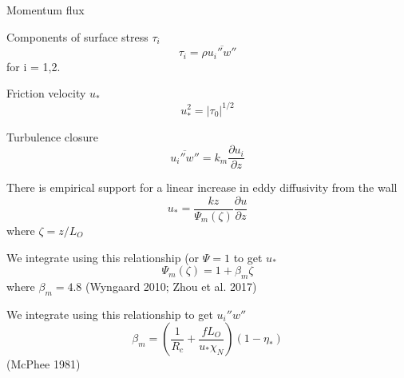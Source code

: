 Momentum flux

Components of surface stress $\tau_i$
\begin{equation*}
\tau_i = \rho \overline{u_i''w''}
\end{equation*}
for i = 1,2.

Friction velocity $u_*$
\begin{equation*}
u_*^2=|\tau_0|^{1/2}
\end{equation*}

Turbulence closure
\begin{equation*}
\overline{u_i''w''} = k_m \frac{\partial u_i}{\partial z}
\end{equation*}

There is empirical support for a linear increase in eddy diffusivity from the wall
\begin{equation*}
u_* = \frac{k z}{\Psi_m(\zeta) } \frac{\partial u}{\partial z}
\end{equation*}
where $\zeta = z/L_O$

We integrate using this relationship (or $\Psi = 1$ to get $u_*$
\begin{equation*}
\Psi_m(\zeta) = 1 + \beta_m \zeta
\end{equation*}
where $\beta_m = 4.8$ (Wyngaard 2010; Zhou et al. 2017)

We integrate using this relationship to get $u_i''w''$
\begin{equation*}
\beta_m = (\frac{1}{R_c} + \frac{f L_O}{u_* \chi_N})(1-\eta_*)
\end{equation*}
(McPhee 1981)



